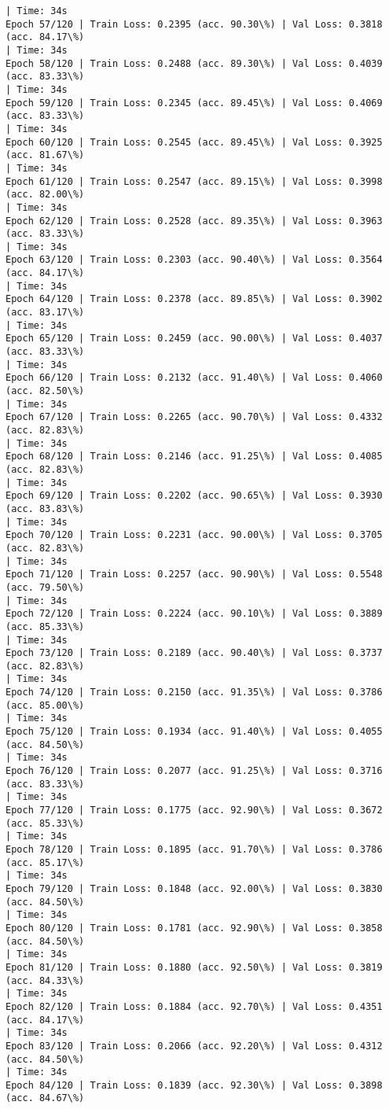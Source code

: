 \documentclass[8pt]{extarticle}
\begin{document}
\begin{Verbatim}[commandchars=\\\{\}]
| Time: 34s
Epoch 57/120 | Train Loss: 0.2395 (acc. 90.30\%) | Val Loss: 0.3818 (acc. 84.17\%)
| Time: 34s
Epoch 58/120 | Train Loss: 0.2488 (acc. 89.30\%) | Val Loss: 0.4039 (acc. 83.33\%)
| Time: 34s
Epoch 59/120 | Train Loss: 0.2345 (acc. 89.45\%) | Val Loss: 0.4069 (acc. 83.33\%)
| Time: 34s
Epoch 60/120 | Train Loss: 0.2545 (acc. 89.45\%) | Val Loss: 0.3925 (acc. 81.67\%)
| Time: 34s
Epoch 61/120 | Train Loss: 0.2547 (acc. 89.15\%) | Val Loss: 0.3998 (acc. 82.00\%)
| Time: 34s
Epoch 62/120 | Train Loss: 0.2528 (acc. 89.35\%) | Val Loss: 0.3963 (acc. 83.33\%)
| Time: 34s
Epoch 63/120 | Train Loss: 0.2303 (acc. 90.40\%) | Val Loss: 0.3564 (acc. 84.17\%)
| Time: 34s
Epoch 64/120 | Train Loss: 0.2378 (acc. 89.85\%) | Val Loss: 0.3902 (acc. 83.17\%)
| Time: 34s
Epoch 65/120 | Train Loss: 0.2459 (acc. 90.00\%) | Val Loss: 0.4037 (acc. 83.33\%)
| Time: 34s
Epoch 66/120 | Train Loss: 0.2132 (acc. 91.40\%) | Val Loss: 0.4060 (acc. 82.50\%)
| Time: 34s
Epoch 67/120 | Train Loss: 0.2265 (acc. 90.70\%) | Val Loss: 0.4332 (acc. 82.83\%)
| Time: 34s
Epoch 68/120 | Train Loss: 0.2146 (acc. 91.25\%) | Val Loss: 0.4085 (acc. 82.83\%)
| Time: 34s
Epoch 69/120 | Train Loss: 0.2202 (acc. 90.65\%) | Val Loss: 0.3930 (acc. 83.83\%)
| Time: 34s
Epoch 70/120 | Train Loss: 0.2231 (acc. 90.00\%) | Val Loss: 0.3705 (acc. 82.83\%)
| Time: 34s
Epoch 71/120 | Train Loss: 0.2257 (acc. 90.90\%) | Val Loss: 0.5548 (acc. 79.50\%)
| Time: 34s
Epoch 72/120 | Train Loss: 0.2224 (acc. 90.10\%) | Val Loss: 0.3889 (acc. 85.33\%)
| Time: 34s
Epoch 73/120 | Train Loss: 0.2189 (acc. 90.40\%) | Val Loss: 0.3737 (acc. 82.83\%)
| Time: 34s
Epoch 74/120 | Train Loss: 0.2150 (acc. 91.35\%) | Val Loss: 0.3786 (acc. 85.00\%)
| Time: 34s
Epoch 75/120 | Train Loss: 0.1934 (acc. 91.40\%) | Val Loss: 0.4055 (acc. 84.50\%)
| Time: 34s
Epoch 76/120 | Train Loss: 0.2077 (acc. 91.25\%) | Val Loss: 0.3716 (acc. 83.33\%)
| Time: 34s
Epoch 77/120 | Train Loss: 0.1775 (acc. 92.90\%) | Val Loss: 0.3672 (acc. 85.33\%)
| Time: 34s
Epoch 78/120 | Train Loss: 0.1895 (acc. 91.70\%) | Val Loss: 0.3786 (acc. 85.17\%)
| Time: 34s
Epoch 79/120 | Train Loss: 0.1848 (acc. 92.00\%) | Val Loss: 0.3830 (acc. 84.50\%)
| Time: 34s
Epoch 80/120 | Train Loss: 0.1781 (acc. 92.90\%) | Val Loss: 0.3858 (acc. 84.50\%)
| Time: 34s
Epoch 81/120 | Train Loss: 0.1880 (acc. 92.50\%) | Val Loss: 0.3819 (acc. 84.33\%)
| Time: 34s
Epoch 82/120 | Train Loss: 0.1884 (acc. 92.70\%) | Val Loss: 0.4351 (acc. 84.17\%)
| Time: 34s
Epoch 83/120 | Train Loss: 0.2066 (acc. 92.20\%) | Val Loss: 0.4312 (acc. 84.50\%)
| Time: 34s
Epoch 84/120 | Train Loss: 0.1839 (acc. 92.30\%) | Val Loss: 0.3898 (acc. 84.67\%)

\end{Verbatim}
\end{document}
